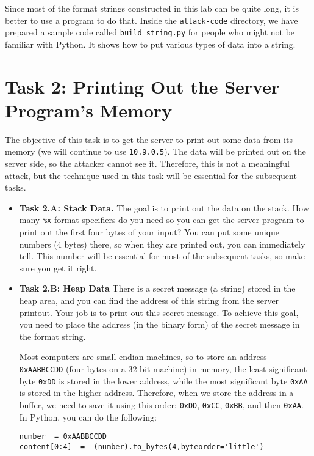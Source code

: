 Since most of the format strings constructed in this lab can be quite long,
it is better to use a program to do that. Inside the \texttt{attack-code} 
directory, we have prepared a sample code called \texttt{build\_string.py}
for people who might not be familiar with Python. It shows how to put 
various types of data into a string. 




\section{Task 2: Printing Out the Server Program's Memory}

The objective of this task is to get the server to print out some data 
from its memory (we will continue to use \texttt{10.9.0.5}). 
The data will be printed out on the server side, so
the attacker cannot see it. Therefore, this is not a meaningful
attack, but the technique used in this task will be essential for 
the subsequent tasks. 


\begin{itemize} 
\item \textbf{Task 2.A: Stack Data.}
The goal is to print out the data on the stack.
How many \texttt{\%x} format specifiers do you need so you can get 
the server program to print out the first four bytes of your 
input? You can put some unique numbers (4 bytes) 
there, so when they are printed out, you can immediately tell. 
This number will be essential for most of the subsequent tasks, 
so make sure you get it right. 


\item \textbf{Task 2.B: Heap Data} 
There is a secret message (a string) stored in the heap area, and you can find 
the address of this string from the server printout. 
Your job is to print out this secret message. 
To achieve this goal, you need to place the address (in the binary form) 
of the secret message in the format string.

Most computers are small-endian machines, so to store
an address \texttt{0xAABBCCDD} (four bytes on a 32-bit machine) in memory, 
the least significant byte \texttt{0xDD} is stored in the lower address,
while the most significant byte \texttt{0xAA} is stored in the higher 
address. Therefore, when we store the address in a buffer, we need to 
save it using this order: \texttt{0xDD}, \texttt{0xCC}, \texttt{0xBB}, and 
then \texttt{0xAA}. In Python, you can do the following:

\begin{lstlisting}
number  = 0xAABBCCDD
content[0:4]  =  (number).to_bytes(4,byteorder='little')
\end{lstlisting}
     
\end{itemize} 





